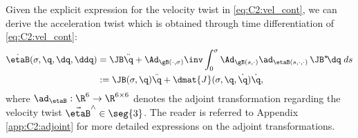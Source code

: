 Given the explicit expression for the velocity twist in \eqref{eq:C2:vel_cont}, we can derive the acceleration twist \cite{Boyer2021,Mochiyama2003,Renda2018} which is obtained through time differentiation of \eqref{eq:C2:vel_cont}:
%
\begin{align}
\dot{\etaB}(\sigma,\q,\dq,\ddq) & = \JB \ddot{\q} + \Ad_{\gB(\cdot,\sigma)} \inv \int_0^\sigma \Ad_{\gB(s,\cdot)}
\ad_{\etaB(s,\cdot,\cdot)} \, \JB^\star\! \dq \;ds \notag \\
& :=  \JB(\sigma,\q)\ddot{\q} + \dmat{J}(\sigma,\q,\dot{\q}) \dot{\q},
\label{eq:C2:acceleration}
\end{align}
%
where $\ad_{\etaB}: \R^{6} \to \R^{6\times 6}$ denotes the adjoint transformation regarding the velocity twist $\vec{\etaB}^\wedge \in \seg{3}$. The reader is referred to Appendix \ref{app:C2:adjoint} for more detailed expressions on the adjoint transformations.
%
